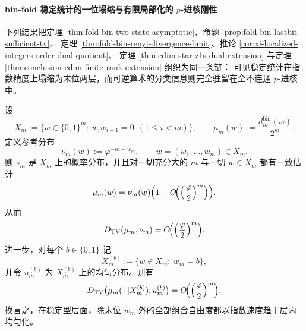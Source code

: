 \paragraph{bin-fold 稳定统计的一位塌缩与有限局部化的 \(p\)-进核刚性}
下列结果把定理 \ref{thm:fold-bin-two-state-asymptotic}、命题 \ref{prop:fold-bin-lastbit-sufficient-tv}、
定理 \ref{thm:fold-bin-renyi-divergence-limit}、推论 \ref{cor:xi-localized-integers-order-dual-quotient}、
定理 \ref{thm:cdim-star-z1s-dual-extension} 与定理
\ref{thm:conclusion-cdim-finite-rank-extension} 组织为同一条链：
可见稳定统计在指数精度上塌缩为末位两层，而可逆算术的分类信息则完全驻留在全不连通
\(p\)-进核中。

\begin{theorem}[稳定型分布的末位充分性与两层模型塌缩]\label{thm:xi-fold-lastbit-two-layer-collapse}
设
\[
X_m:=\{w\in\{0,1\}^m:\ w_iw_{i+1}=0\ \ (1\le i<m)\},
\qquad
\mu_m(w):=\frac{d_m^{\mathrm{bin}}(w)}{2^m}.
\]
定义参考分布
\[
\nu_m(w):=\varphi^{-m-w_m},
\qquad
w=(w_1,\dots,w_m)\in X_m.
\]
则 \(\nu_m\) 是 \(X_m\) 上的概率分布，并且对一切充分大的 \(m\) 与一切 \(w\in X_m\) 都有一致估计
\[
\mu_m(w)=\nu_m(w)\Bigl(1+O\!\Bigl(\Bigl(\frac{\varphi}{2}\Bigr)^m\Bigr)\Bigr).
\]
从而
\[
D_{\mathrm{TV}}(\mu_m,\nu_m)=O\!\Bigl(\Bigl(\frac{\varphi}{2}\Bigr)^m\Bigr).
\]
进一步，对每个 \(b\in\{0,1\}\) 记
\[
X_m^{(b)}:=\{w\in X_m:\ w_m=b\},
\]
并令 \(u_m^{(b)}\) 为 \(X_m^{(b)}\) 上的均匀分布。则有
\[
D_{\mathrm{TV}}\bigl(\mu_m(\,\cdot\,|X_m^{(b)}),u_m^{(b)}\bigr)
=O\!\Bigl(\Bigl(\frac{\varphi}{2}\Bigr)^m\Bigr).
\]
换言之，在稳定型层面，除末位 \(w_m\) 外的全部组合自由度都以指数速度趋于层内均匀化。
\end{theorem}
